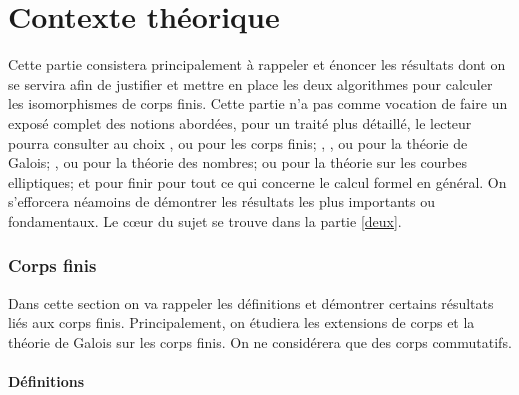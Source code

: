 \documentclass[a4paper]{article} %
\numberwithin{section}{part}
\numberwithin{equation}{section}
\begin{document}
\part{Contexte théorique}

Cette partie consistera principalement à rappeler et énoncer les résultats dont
on se servira afin de justifier et mettre en place les deux algorithmes pour
calculer les isomorphismes de corps finis. Cette partie n'a pas comme vocation
de faire un exposé complet des notions abordées, pour un traité plus détaillé,
le lecteur pourra consulter au choix \cite{LiNi}, \cite{MuPa} ou 
\cite[chap.~III]{Per} pour les corps finis; \cite{Nek}, \cite[chap.~VIII]{Pol},
\cite[chap. VI]{Sam} ou \cite{Esc} pour la théorie de Galois; \cite{Sam}, 
\cite{Wash1} ou \cite{Lan} pour la théorie des nombres; \cite{Sil} ou 
\cite{Wash2} pour la théorie sur les courbes elliptiques; et pour finir 
\cite{GaGe} pour tout ce qui concerne le calcul formel en général. On 
s'efforcera néamoins de démontrer les résultats les plus importants ou 
fondamentaux. Le c\oe ur du sujet se trouve dans la partie \ref{deux}.

\section{Corps finis}
Dans cette section on va rappeler les définitions et démontrer certains 
résultats liés aux corps finis. Principalement, on étudiera les extensions 
de corps et la théorie de Galois sur les corps finis. On ne considérera
que des corps commutatifs.

\subsection{Définitions}
\end{document}
